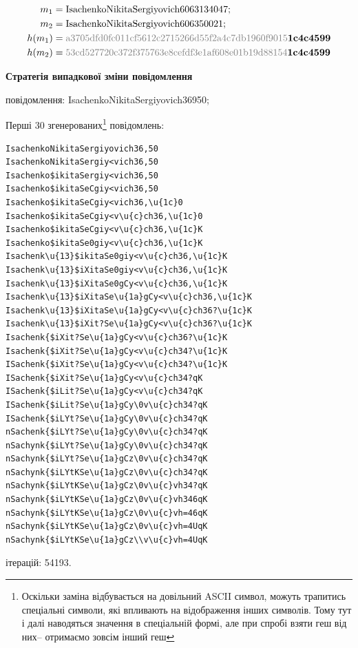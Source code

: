 \documentclass[12pt]{article}
\begin{document}
\begin{align*}
m_1 &= \text{IsachenkoNikitaSergiyovich6063134047}; \\
m_2 &= \text{IsachenkoNikitaSergiyovich606350021}; \\
h(m_1) &= \textcolor{codegray}{\text{a3705dfd0fc011cf5612c2715266d55f2a4c7db1960f9015}}\text{\textbf{1c4c4599}} \\
h(m_2) &= \textcolor{codegray}{\text{53cd527720c372f375763e8cefdf3e1af608e01b19d88154}}\text{\textbf{1c4c4599}}
\end{align*}

\textbf{Стратегія випадкової зміни повідомлення}

 повідомлення: IsachenkoNikitaSergiyovich36950;

\noindent Перші 30 згенерованих\footnote{Оскільки заміна відбувається на довільний ASCII символ, можуть трапитись спеціальні символи, які впливають на відображення інших символів. Тому тут і далі наводяться значення в спеціальній формі, але при спробі взяти геш від них-- отримаємо зовсім інший геш} повідомлень:
\begin{verbatim}
IsachenkoNikitaSergiyovich36,50
IsachenkoNikitaSergiy<vich36,50
Isachenko$ikitaSergiy<vich36,50
Isachenko$ikitaSeCgiy<vich36,50
Isachenko$ikitaSeCgiy<vich36,\u{1c}0
Isachenko$ikitaSeCgiy<v\u{c}ch36,\u{1c}0
Isachenko$ikitaSeCgiy<v\u{c}ch36,\u{1c}K
Isachenko$ikitaSe0giy<v\u{c}ch36,\u{1c}K
Isachenk\u{13}$ikitaSe0giy<v\u{c}ch36,\u{1c}K
Isachenk\u{13}$iXitaSe0giy<v\u{c}ch36,\u{1c}K
Isachenk\u{13}$iXitaSe0gCy<v\u{c}ch36,\u{1c}K
Isachenk\u{13}$iXitaSe\u{1a}gCy<v\u{c}ch36,\u{1c}K
Isachenk\u{13}$iXitaSe\u{1a}gCy<v\u{c}ch36?\u{1c}K
Isachenk\u{13}$iXit?Se\u{1a}gCy<v\u{c}ch36?\u{1c}K
Isachenk{$iXit?Se\u{1a}gCy<v\u{c}ch36?\u{1c}K
Isachenk{$iXit?Se\u{1a}gCy<v\u{c}ch34?\u{1c}K
ISachenk{$iXit?Se\u{1a}gCy<v\u{c}ch34?\u{1c}K
ISachenk{$iXit?Se\u{1a}gCy<v\u{c}ch34?qK
ISachenk{$iLit?Se\u{1a}gCy<v\u{c}ch34?qK
ISachenk{$iLit?Se\u{1a}gCy\0v\u{c}ch34?qK
ISachenk{$iLYt?Se\u{1a}gCy\0v\u{c}ch34?qK
nSachenk{$iLYt?Se\u{1a}gCy\0v\u{c}ch34?qK
nSachynk{$iLYt?Se\u{1a}gCy\0v\u{c}ch34?qK
nSachynk{$iLYt?Se\u{1a}gCz\0v\u{c}ch34?qK
nSachynk{$iLYtKSe\u{1a}gCz\0v\u{c}ch34?qK
nSachynk{$iLYtKSe\u{1a}gCz\0v\u{c}vh34?qK
nSachynk{$iLYtKSe\u{1a}gCz\0v\u{c}vh346qK
nSachynk{$iLYtKSe\u{1a}gCz\0v\u{c}vh=46qK
nSachynk{$iLYtKSe\u{1a}gCz\0v\u{c}vh=4UqK
nSachynk{$iLYtKSe\u{1a}gCz\\v\u{c}vh=4UqK
\end{verbatim}

 ітерацій: 54193.
\end{document}
